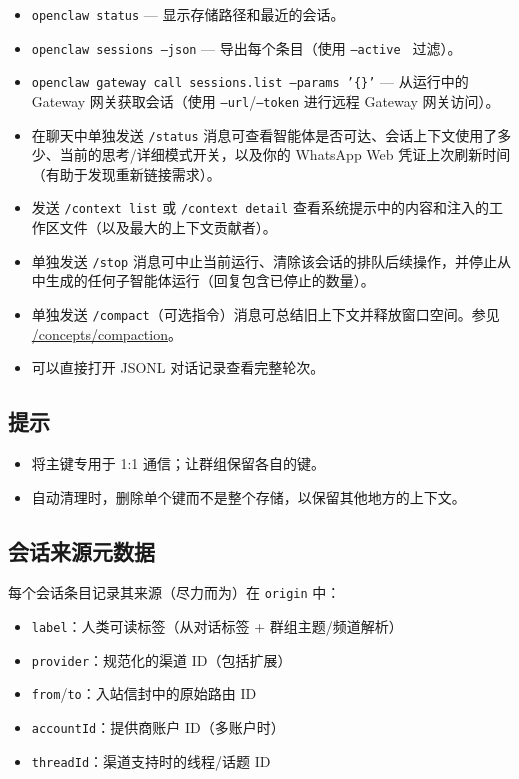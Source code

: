 \begin{itemize}
  \item \texttt{openclaw status} — 显示存储路径和最近的会话。
  \item \texttt{openclaw sessions --json} — 导出每个条目（使用 \texttt{--active } 过滤）。
  \item \texttt{openclaw gateway call sessions.list --params '\{\}'} — 从运行中的 Gateway 网关获取会话（使用 \texttt{--url}/\texttt{--token} 进行远程 Gateway 网关访问）。
  \item 在聊天中单独发送 \texttt{/status} 消息可查看智能体是否可达、会话上下文使用了多少、当前的思考/详细模式开关，以及你的 WhatsApp Web 凭证上次刷新时间（有助于发现重新链接需求）。
  \item 发送 \texttt{/context list} 或 \texttt{/context detail} 查看系统提示中的内容和注入的工作区文件（以及最大的上下文贡献者）。
  \item 单独发送 \texttt{/stop} 消息可中止当前运行、清除该会话的排队后续操作，并停止从中生成的任何子智能体运行（回复包含已停止的数量）。
  \item 单独发送 \texttt{/compact}（可选指令）消息可总结旧上下文并释放窗口空间。参见 \href{/concepts/compaction}{/concepts/compaction}。
  \item 可以直接打开 JSONL 对话记录查看完整轮次。
\end{itemize}


\subsection{提示}


\begin{itemize}
  \item 将主键专用于 1:1 通信；让群组保留各自的键。
  \item 自动清理时，删除单个键而不是整个存储，以保留其他地方的上下文。
\end{itemize}


\subsection{会话来源元数据}


每个会话条目记录其来源（尽力而为）在 \texttt{origin} 中：

\begin{itemize}
  \item \texttt{label}：人类可读标签（从对话标签 + 群组主题/频道解析）
  \item \texttt{provider}：规范化的渠道 ID（包括扩展）
  \item \texttt{from}/\texttt{to}：入站信封中的原始路由 ID
  \item \texttt{accountId}：提供商账户 ID（多账户时）
  \item \texttt{threadId}：渠道支持时的线程/话题 ID
\end{itemize}

